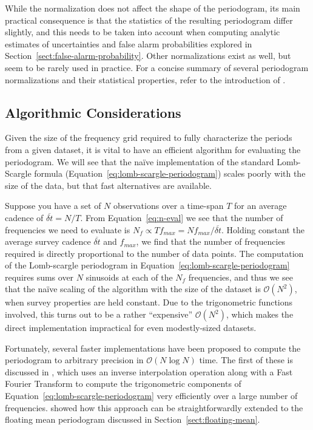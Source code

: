 \documentclass[preprint]{aastex}
\newcommand{\Eq}[1]{Equation~\ref{eq:#1}}
\newcommand{\eq}[1]{\Eq{#1}}
\newcommand{\Sect}[1]{Section~\ref{sect:#1}}
\newcommand{\sect}[1]{\Sect{#1}}
\newcommand{\sectlabel}[1]{\label{sect:#1}}
\begin{document}
While the normalization does not affect the shape of the periodogram,
its main practical consequence is that the statistics of the resulting
periodogram differ slightly, and this needs to be taken into account when
computing analytic estimates of uncertainties and false alarm probabilities
explored in \sect{false-alarm-probability}.
Other normalizations exist as well, but seem to be rarely used in practice.
For a concise summary of several periodogram normalizations and their
statistical properties, refer to the introduction of \citet{Baluev2008}.

\subsection{Algorithmic Considerations}
\sectlabel{algorithmic-considerations}
Given the size of the frequency grid required to fully characterize the periods
from a given dataset, it is vital to have an efficient algorithm for evaluating
the periodogram. We will see that the na{\"i}ve implementation of
the standard Lomb-Scargle formula (\eq{lomb-scargle-periodogram})
scales poorly with the size of the data, but that
fast alternatives are available.

Suppose you have a set of $N$ observations over a time-span $T$ for an average
cadence of $\overline{\delta t} = N/T$.
From \eq{n-eval} we see that the number of frequencies we need to evaluate is
$N_f \propto T f_{max} = N f_{max} / \overline{\delta t}$.
Holding constant the average survey cadence $\overline{\delta t}$ and
$f_{max}$, we find that the number of
frequencies required is directly proportional to the number of data points.
The computation of the Lomb-scargle periodogram in \eq{lomb-scargle-periodogram}
requires sums over $N$ sinusoids at each of the
$N_f$ frequencies, and thus we see that the
na{\"i}ve scaling of the algorithm with the size of the dataset is
$\mathcal{O}(N^2)$, when survey properties are held constant.
Due to the trigonometric functions involved, this turns out to be a rather
``expensive'' $\mathcal{O}(N^2)$, which makes the direct
implementation impractical for even modestly-sized datasets.

Fortunately, several faster implementations have been proposed to compute the
periodogram to arbitrary precision in $\mathcal{O}(N\log N)$ time.
The first of these is discussed in \citet{Press89}, which uses an inverse
interpolation operation along with a Fast Fourier Transform to compute the
trigonometric components of \eq{lomb-scargle-periodogram} very efficiently over
a large number of frequencies.
\citet{Zechmeister09} showed how this approach can be straightforwardly
extended to the floating mean periodogram discussed in \sect{floating-mean}.
\end{document}
